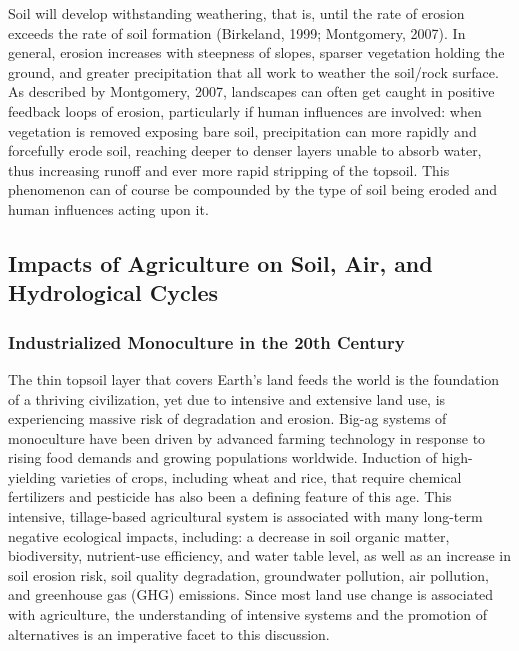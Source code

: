 \documentclass{book}\usepackage{knitr}
\begin{document}
Soil will develop withstanding weathering, that is, until the rate of erosion exceeds the rate of soil formation (Birkeland, 1999; Montgomery, 2007). In general, erosion increases with steepness of slopes, sparser vegetation holding the ground, and greater precipitation that all work to weather the soil/rock surface. As described by Montgomery, 2007, landscapes can often get caught in positive feedback loops of erosion, particularly if human influences are involved: when vegetation is removed exposing bare soil, precipitation can more rapidly and forcefully erode soil, reaching deeper to denser layers unable to absorb water, thus increasing runoff and ever more rapid stripping of the topsoil. This phenomenon can of course be compounded by the type of soil being eroded and human influences acting upon it.

\subsection{Impacts of Agriculture on Soil, Air, and Hydrological Cycles}

\subsubsection{Industrialized Monoculture in the 20th Century}
The thin topsoil layer that covers Earth’s land feeds the world is the foundation of a thriving civilization, yet due to intensive and extensive land use, is experiencing massive risk of degradation and erosion. Big-ag systems of monoculture have been driven by advanced farming technology in response to rising food demands and growing populations worldwide. Induction of high-yielding varieties of crops, including wheat and rice, that require chemical fertilizers and pesticide has also been a defining feature of this age. This intensive, tillage-based agricultural system is associated with many long-term negative ecological impacts, including: a decrease in soil organic matter, biodiversity, nutrient-use efficiency, and water table level, as well as an increase in soil erosion risk, soil quality degradation, groundwater pollution, air pollution, and greenhouse gas (GHG) emissions. Since most land use change is associated with agriculture, the understanding of intensive systems and the promotion of alternatives is an imperative facet to this discussion.
\end{document}

